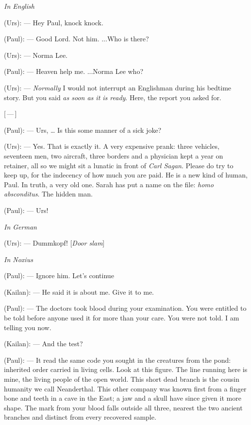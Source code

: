 \begin{room}

\textit{In English}

(Urs): --- Hey Paul, knock knock.

(Paul): --- Good Lord. Not him. ...Who is there?

(Urs): --- Norma Lee.

(Paul): --- Heaven help me. ...Norma Lee who? 

(Urs): --- \textit{Normally} I would not interrupt an Englishman during his bedtime story. But you said \textit{as soon as it is ready}. Here, the report you asked for.

\centerline{[\,---\,]}

(Paul): --- Urs, \ldots{} Is this some manner of a sick joke?

(Urs): --- Yes. That is exactly it. A very expensive prank: three vehicles, seventeen men, two aircraft, three borders and a physician kept a year on retainer, all so we might sit a lunatic in front of \textit{Carl Sagan}. Please do try to keep up, for the indecency of how much you are paid. He is a new kind of human, Paul. In truth, a very old one. Sarah has put a name on the file: \textit{homo absconditus}. The hidden man.

(Paul): --- Urs!

\textit{In German}

(Urs): --- Dummkopf! [\textit{Door slam}]

\textit{In Noxius}

(Paul): --- Ignore him. Let's continue

(Kailan): --- He said it is about me. Give it to me.

(Paul): --- The doctors took blood during your examination. You were entitled to be told before anyone used it for more than your care. You were not told. I am telling you now.

(Kailan): --- And the test?

(Paul): --- It read the same code you sought in the creatures from the pond: inherited order carried in living cells. Look at this figure. The line running here is mine, the living people of the open world. This short dead branch is the cousin humanity we call Neanderthal. This other company was known first from a finger bone and teeth in a cave in the East; a jaw and a skull have since given it more shape. The mark from your blood falls outside all three, nearest the two ancient branches and distinct from every recovered sample.


\end{room}

